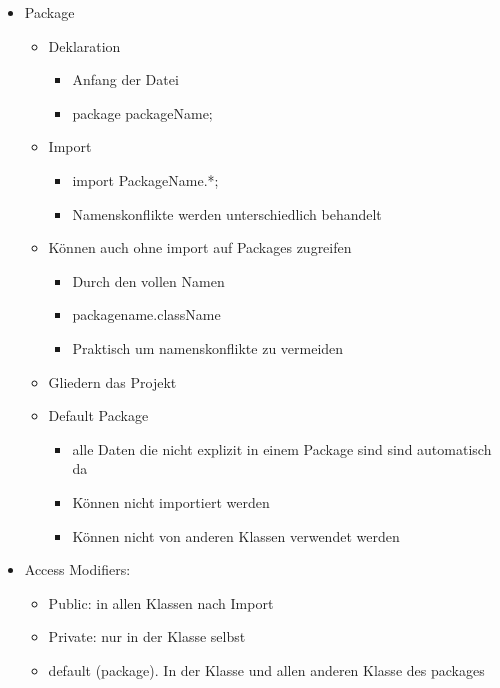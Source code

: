 \documentclass[11pt]{article}
\begin{document}
\begin{itemize}
\item Package\\
\begin{itemize}
\item Deklaration\\
\begin{itemize}
\item Anfang der Datei\\
\item package packageName;\\
\end{itemize}
\item Import\\
\begin{itemize}
\item import PackageName.*;\\
\item Namenskonflikte werden unterschiedlich behandelt\\
\end{itemize}
\item Können auch ohne import auf Packages zugreifen\\
\begin{itemize}
\item Durch den vollen Namen\\
\item packagename.className\\
\item Praktisch um namenskonflikte zu vermeiden\\
\end{itemize}
\item Gliedern das Projekt\\
\item Default Package\\
\begin{itemize}
\item alle Daten die nicht explizit in einem Package sind sind automatisch da\\
\item Können nicht importiert werden\\
\item Können nicht von anderen Klassen verwendet werden\\
\end{itemize}
\end{itemize}
\item Access Modifiers:\\
\begin{itemize}
\item Public: in allen Klassen nach Import\\
\item Private: nur in der Klasse selbst\\
\item default (package). In der Klasse und allen anderen Klasse des packages\\
\end{itemize}
\end{itemize}
\end{document}
